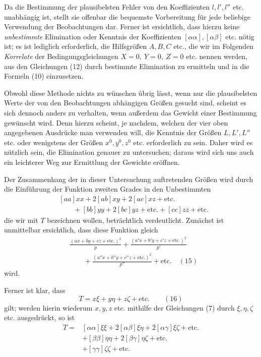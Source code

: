 Da die Bestimmung der plausibelsten Fehler von den Koeffizienten \(l,l',l''\) etc. unabhängig ist, stellt sie offenbar die bequemste Vorbereitung für jede beliebige Verwendung der Beobachtungen dar. Ferner ist ersichtlich, dass hierzu keine \textit{unbestimmte} Elimination oder Kenntnis der Koeffizienten \([\alpha\alpha],[\alpha\beta]\) etc. nötig ist; es ist lediglich erforderlich, die Hilfsgrößen \(A,B,C\) etc., die wir im Folgenden \textit{Korrelate} der Bedingungsgleichungen \(X=0,\ Y=0,\ Z=0\) etc. nennen werden, aus den Gleichungen (12) durch bestimmte Elimination zu ermitteln und in die Formeln (10) einzusetzen.

Obwohl diese Methode nichts zu wünschen übrig lässt, wenn nur die plausibelsten Werte der von den Beobachtungen abhängigen Größen gesucht sind, scheint es sich dennoch anders zu verhalten, wenn außerdem das Gewicht einer Bestimmung gewünscht wird. Denn hierzu scheint, je nachdem, welchen der vier oben angegebenen Ausdrücke man verwenden will, die Kenntnis der Größen \(L,L',L''\) etc. oder wenigstens der Größen \(x^0,y^0,z^0\) etc. erforderlich zu sein. Daher wird es nützlich sein, die Elimination genauer zu untersuchen; daraus wird sich uns auch ein leichterer Weg zur Ermittlung der Gewichte eröffnen.

Der Zusammenhang der in dieser Untersuchung auftretenden Größen wird durch die Einführung der Funktion zweiten Grades in den Unbestimmten
\[
\begin{aligned}&[aa]xx+2[ab]xy+2[ac]xz+\text{etc.}\\&\qquad+[bb]yy+2[bc]yz+\text{etc.}+[cc]zz+\text{etc.}\end{aligned}
\]
die wir mit \(T\) bezeichnen wollen, beträchtlich verdeutlicht. Zunächst ist unmittelbar ersichtlich, dass diese Funktion gleich
\[
\begin{aligned}&\frac{(ax+by+cz+\text{etc.})^2}{p}+\frac{(a'x+b'y+c'z+\text{etc.})^2}{p'}\\&\qquad+\frac{(a''x+b''y+c''z+\text{etc.})^2}{p''}+\text{etc.}\quad(15)\end{aligned}
\]
wird.

Ferner ist klar, dass
\[
T=x\xi+y\eta+z\zeta+\text{etc.}\qquad(16)
\]
gilt; werden hierin wiederum \(x,y,z\) etc. mithilfe der Gleichungen (7) durch \(\xi,\eta,\zeta\) etc. ausgedrückt, so ist
\[
\begin{aligned}
T={}&[\alpha\alpha]\xi\xi+2[\alpha\beta]\xi\eta+2[\alpha\gamma]\xi\zeta+\text{etc.}\\&+[\beta\beta]\eta\eta+2[\beta\gamma]\eta\zeta+\text{etc.}\\
&+[\gamma\gamma]\zeta\zeta+\text{etc.}
\end{aligned}
\]

